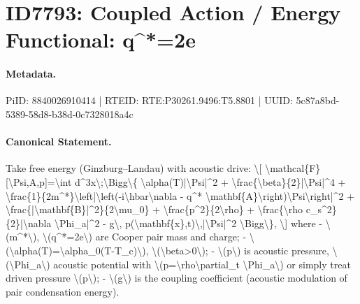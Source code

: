 \section*{ID7793: Coupled Action / Energy Functional: q\textasciicircum{}*=2e}
\paragraph{Metadata.}
PiID: 8840026910414 | RTEID: RTE:P30261.9496:T5.8801 | UUID: 5c87a8bd-5389-58d8-b38d-0c7328018a4c

\paragraph{Canonical Statement.}
Take free energy (Ginzburg–Landau) with acoustic drive: \textbackslash{}[ \textbackslash{}mathcal\{F\}[\textbackslash{}Psi,A,p]=\textbackslash{}int d\textasciicircum{}3x\textbackslash{};\textbackslash{}Bigg\textbackslash{}\{ \textbackslash{}alpha(T)|\textbackslash{}Psi|\textasciicircum{}2 + \textbackslash{}frac\{\textbackslash{}beta\}\{2\}|\textbackslash{}Psi|\textasciicircum{}4 + \textbackslash{}frac\{1\}\{2m\textasciicircum{}*\}\textbackslash{}left|\textbackslash{}left(-i\textbackslash{}hbar\textbackslash{}nabla - q\textasciicircum{}* \textbackslash{}mathbf\{A\}\textbackslash{}right)\textbackslash{}Psi\textbackslash{}right|\textasciicircum{}2 + \textbackslash{}frac\{|\textbackslash{}mathbf\{B\}|\textasciicircum{}2\}\{2\textbackslash{}mu\_0\} + \textbackslash{}frac\{p\textasciicircum{}2\}\{2\textbackslash{}rho\} + \textbackslash{}frac\{\textbackslash{}rho c\_s\textasciicircum{}2\}\{2\}|\textbackslash{}nabla \textbackslash{}Phi\_a|\textasciicircum{}2 - g\textbackslash{}, p(\textbackslash{}mathbf\{x\},t)\textbackslash{},|\textbackslash{}Psi|\textasciicircum{}2 \textbackslash{}Bigg\textbackslash{}\}, \textbackslash{}] where - \textbackslash{}(m\textasciicircum{}*\textbackslash{}), \textbackslash{}(q\textasciicircum{}*=2e\textbackslash{}) are Cooper pair mass and charge; - \textbackslash{}(\textbackslash{}alpha(T)=\textbackslash{}alpha\_0(T-T\_c)\textbackslash{}), \textbackslash{}(\textbackslash{}beta>0\textbackslash{}); - \textbackslash{}(p\textbackslash{}) is acoustic pressure, \textbackslash{}(\textbackslash{}Phi\_a\textbackslash{}) acoustic potential with \textbackslash{}(p=\textbackslash{}rho\textbackslash{}partial\_t \textbackslash{}Phi\_a\textbackslash{}) or simply treat driven pressure \textbackslash{}(p\textbackslash{}); - \textbackslash{}(g\textbackslash{}) is the coupling coefficient (acoustic modulation of pair condensation energy).


